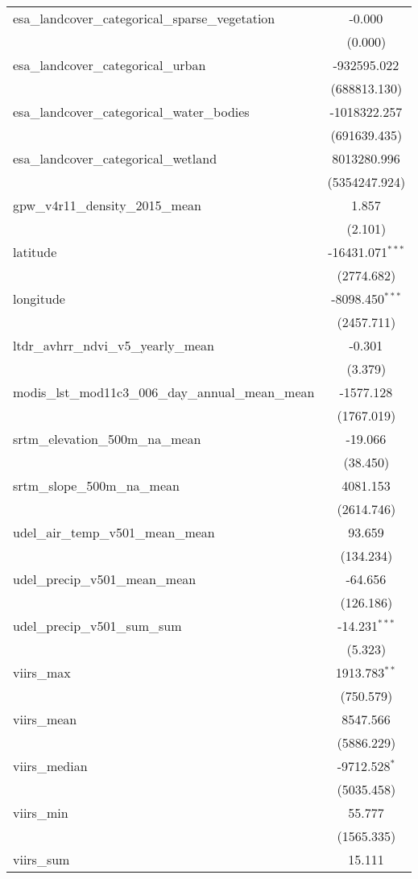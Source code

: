 \begin{table}[!htbp]
\begin{tabular}{@{\extracolsep{5pt}}lc}
 esa_landcover_categorical_sparse_vegetation & -0.000$^{}$ \\
  & (0.000) \\
 esa_landcover_categorical_urban & -932595.022$^{}$ \\
  & (688813.130) \\
 esa_landcover_categorical_water_bodies & -1018322.257$^{}$ \\
  & (691639.435) \\
 esa_landcover_categorical_wetland & 8013280.996$^{}$ \\
  & (5354247.924) \\
 gpw_v4r11_density_2015_mean & 1.857$^{}$ \\
  & (2.101) \\
 latitude & -16431.071$^{***}$ \\
  & (2774.682) \\
 longitude & -8098.450$^{***}$ \\
  & (2457.711) \\
 ltdr_avhrr_ndvi_v5_yearly_mean & -0.301$^{}$ \\
  & (3.379) \\
 modis_lst_mod11c3_006_day_annual_mean_mean & -1577.128$^{}$ \\
  & (1767.019) \\
 srtm_elevation_500m_na_mean & -19.066$^{}$ \\
  & (38.450) \\
 srtm_slope_500m_na_mean & 4081.153$^{}$ \\
  & (2614.746) \\
 udel_air_temp_v501_mean_mean & 93.659$^{}$ \\
  & (134.234) \\
 udel_precip_v501_mean_mean & -64.656$^{}$ \\
  & (126.186) \\
 udel_precip_v501_sum_sum & -14.231$^{***}$ \\
  & (5.323) \\
 viirs_max & 1913.783$^{**}$ \\
  & (750.579) \\
 viirs_mean & 8547.566$^{}$ \\
  & (5886.229) \\
 viirs_median & -9712.528$^{*}$ \\
  & (5035.458) \\
 viirs_min & 55.777$^{}$ \\
  & (1565.335) \\
 viirs_sum & 15.111$^{}$ \\

\end{tabular}
\end{table}
